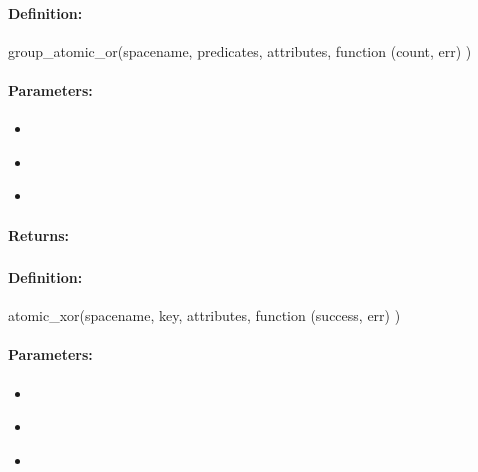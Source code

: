 \paragraph{Definition:}
\begin{javascriptcode}
group_atomic_or(spacename, predicates, attributes, function (count, err) {})
\end{javascriptcode}
\paragraph{Parameters:}
\begin{itemize}[noitemsep]
\item {}\\

\item {}\\

\item {}\\

\end{itemize}

\paragraph{Returns:}


\pagebreak
\subsubsection{}
\label{api:nodejs:atomic_xor}


\paragraph{Definition:}
\begin{javascriptcode}
atomic_xor(spacename, key, attributes, function (success, err) {})
\end{javascriptcode}
\paragraph{Parameters:}
\begin{itemize}[noitemsep]
\item {}\\

\item {}\\

\item {}\\

\end{itemize}

